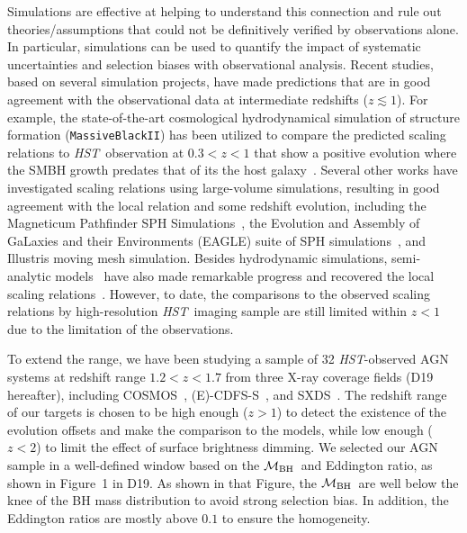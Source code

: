 \documentclass{natureprintstyle}
\newcommand{\hst}{{\it HST}}
\newcommand{\mbh}{$\mathcal M_{\rm BH}$}
\begin{document}
Simulations are effective at helping to understand this connection and rule out theories/assumptions that could not be definitively verified by observations alone. In particular, simulations can be used to quantify the impact of systematic uncertainties and selection biases with observational analysis. Recent studies, based on several simulation projects, have made predictions that are in good agreement with the observational data at intermediate redshifts ($z\lesssim1$). For example, the state-of-the-art cosmological hydrodynamical simulation of structure formation (\texttt{MassiveBlackII}) has been utilized to compare the predicted scaling relations to \hst\ observation at $0.3<z<1$ that show a positive evolution where the SMBH growth predates that of its the host galaxy~\cite{DeG++15}. Several other works have investigated scaling relations using large-volume simulations, resulting in good agreement with the local relation and some redshift evolution, including the Magneticum Pathfinder SPH Simulations~\cite{Steinborn2015}, the Evolution and Assembly of GaLaxies and their Environments (EAGLE) suite of SPH simulations~\cite{Schaye2015}, and Illustris moving mesh simulation\cite{Sijacki2015, Vogelsberger2014, Li2019}. Besides hydrodynamic simulations, semi-analytic models~\cite{Menci2014, Menci2016} have also made remarkable progress and recovered the local scaling relations~\cite{Kormendy13}. However, to date, the comparisons to the observed scaling relations by high-resolution \hst\ imaging sample are still limited within $z<1$ due to the limitation of the observations.

To extend the range, we have been studying a sample of 32 \hst-observed AGN systems at redshift range $1.2<z<1.7$ from three X-ray coverage fields (D19~\cite{Ding2019} hereafter), including COSMOS~\cite{Civano2016}, (E)-CDFS-S~\cite{Lehmer2005, Xue2011}, and SXDS~\cite{Ueda2008}. The redshift range of our targets is chosen to be high enough ($z>1$) to detect the existence of the evolution offsets and make the comparison to the models, while low enough ($z<2$) to limit the effect of surface brightness dimming. 
We selected our AGN sample in a well-defined window based on the \mbh\ and Eddington ratio, as shown in Figure~1 in D19. As shown in that Figure, the \mbh\ are well below the knee of the BH mass distribution to avoid strong selection bias. In addition, the Eddington ratios are mostly above $0.1$ to ensure the homogeneity.
\end{document}
